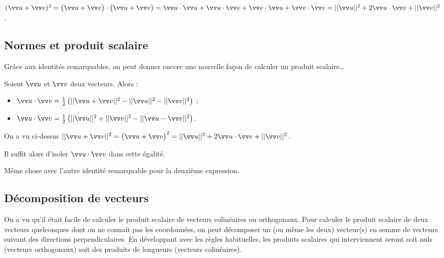 \documentclass[a4paper,11pt]{article}
\begin{document}
\begin{cdemo}
$(\vect{u}+\vect{v})^2=\big(\vect{u}+\vect{v}\big)\cdot\big(\vect{u}+\vect{v}\big)=\vect{u}\cdot\vect{u}+\vect{u}\cdot\vect{v}+\vect{v}\cdot\vect{u}+\vect{v}\cdot\vect{v}=||\vect{u}||^2+2\vect{u}\cdot\vect{v}+||\vect{v}||^2$.
\end{cdemo}

\subsection{Normes et produit scalaire}

\begin{cprop}[s]
Grâce aux identités remarquables, on peut donner encore une nouvelle façon de calculer un produit scalaire\ldots

Soient $\vect{u}$ et $\vect{v}$ deux vecteurs. Alors : 
\begin{itemize}
	\item $\vect{u}\cdot\vect{v}=\tfrac{1}{2}\left(||\vect{u}+\vect{v}||^2-||\vect{u}||^2-||\vect{v}||^2\right)$ ;
	\item $\vect{u}\cdot\vect{v}=\tfrac{1}{2}\left(||\vect{u}||^2+||\vect{v}||^2-||\vect{u}-\vect{v}||^2\right)$.
\end{itemize}
\end{cprop}

\begin{cdemo}
On a vu ci-dessus $||\vect{u}+\vect{v}||^2=\big(\vect{u}+\vect{v}\big)^2=||\vect{u}||^2+2\vect{u}\cdot\vect{v}+||\vect{v}||^2$.

Il suffit alors d'isoler $\vect{u}\cdot\vect{v}$ dans cette égalité.

\smallskip

Même chose avec l'autre identité remarquable pour la deuxième expression.
\end{cdemo}

\subsection{Décomposition de vecteurs}

\begin{cmethode}
On a vu qu'il était facile de calculer le produit scalaire de vecteurs colinéaires ou orthogonaux. Pour calculer le produit scalaire de deux vecteurs quelconques dont on ne connaît pas les coordonnées, on peut décomposer un (ou même les deux) vecteur(s) en somme de vecteurs suivant des directions perpendiculaires. En développant avec les règles habituelles, les produits scalaires qui interviennent seront soit nuls (vecteurs orthogonaux) soit des produits de longueurs (vecteurs colinéaires).
\end{cmethode}
\end{document}
